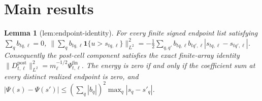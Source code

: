 \documentclass{article}
\newtheorem{lemma}{Lemma}
\begin{document}
\section{Main results}

\begin{lemma}[lem:endpoint-identity]\label{lem:endpoint-identity}
For every finite signed endpoint list satisfying \(\sum_qb_{tq,\ell}=0\), \(\|\sum_qb_{tq,\ell}\mathbf 1\{u>s_{tq,\ell}\}\|_{L^2}^2=-\tfrac12\sum_{q,q'}b_{tq,\ell}b_{tq',\ell}|s_{tq,\ell}-s_{tq',\ell}|\). Consequently the post-cell component satisfies the exact finite-array identity \(\|D_{t,\ell}^{\mathrm{post}}\|_{L^2}^2=m_\ell^{-1/2}\Psi^{\mathrm{fin}}_{t,\ell}\). The energy is zero if and only if the coefficient sum at every distinct realized endpoint is zero, and \(|\Psi(s)-\Psi(s')|\leq(\sum_q|b_q|)^2\max_q|s_q-s'_q|\).
\end{lemma}
\end{document}
